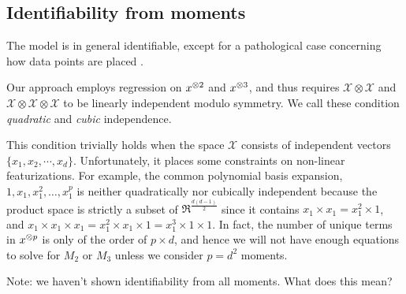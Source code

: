 
\subsection{Identifiability from moments}

The model is in general identifiable, except for a pathological case
concerning how data points are placed \citationneeded.

Our approach employs regression on $x^{\otimes 2}$ and $x^{\otimes 3}$, and thus
requires $\mathcal{X} \otimes \mathcal{X}$ and $\mathcal{X} \otimes
\mathcal{X} \otimes \mathcal{X}$ to be linearly independent modulo
symmetry. We call these condition {\em quadratic} and {\em cubic}
independence.

This condition trivially holds when the space $\mathcal{X}$ consists of
independent vectors $\{ x_1, x_2, \cdots, x_d \}$. Unfortunately, it
places some constraints on non-linear featurizations. For example, the
common polynomial basis expansion, $1, x_1, x_1^2, \dots, x_1^p$ is
neither quadratically nor cubically independent because the product
space is strictly a subset of $\Re^{\frac{d (d-1)}{2}}$ since it
contains $x_1 \times x_1 = x_1^2 \times 1$, and $x_1 \times x_1 \times
x_1 = x_1^2 \times x_1 \times 1 = x_1^3 \times 1 \times 1$. In fact, the
number of unique terms in $x^{\otimes p}$ is only of the order of $p \times
d$, and hence we will not have enough equations to solve for $M_2$ or
$M_3$ unless we consider $p = d^2$ moments.

{\todo Note: we haven't shown identifiability from all moments. What
does this mean?}
